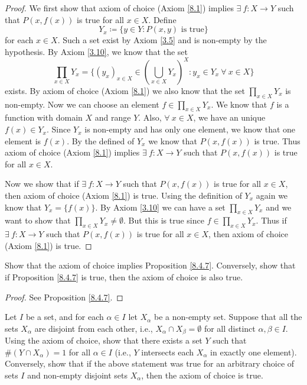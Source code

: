 \begin{proof}
    We first show that axiom of choice (Axiom \ref{8.1}) implies \(\exists\ f : X \to Y\) such that \(P(x, f(x))\) is true for all \(x \in X\).
    Define
    \[
        Y_x \coloneqq \{y \in Y : P(x, y) \text{ is true}\}
    \]
    for each \(x \in X\).
    Such a set exist by Axiom \ref{3.5} and is non-empty by the hypothesis.
    By Axiom \ref{3.10}, we know that the set
    \[
        \prod_{x \in X} Y_x = \Bigg\{(y_x)_{x \in X} \in (\bigcup_{x \in X} Y_x)^X : y_x \in Y_x \ \forall\ x \in X\Bigg\}
    \]
    exists.
    By axiom of choice (Axiom \ref{8.1}) we also know that the set \(\prod_{x \in X} Y_x\) is non-empty.
    Now we can choose an element \(f \in \prod_{x \in X} Y_x\).
    We know that \(f\) is a function with domain \(X\) and range \(Y\).
    Also, \(\forall\ x \in X\), we have an unique \(f(x) \in Y_x\).
    Since \(Y_x\) is non-empty and has only one element, we know that one element is \(f(x)\).
    By the defined of \(Y_x\) we know that \(P(x, f(x))\) is true.
    Thus axiom of choice (Axiom \ref{8.1}) implies \(\exists\ f : X \to Y\) such that \(P(x, f(x))\) is true for all \(x \in X\).

    Now we show that if \(\exists\ f : X \to Y\) such that \(P(x, f(x))\) is true for all \(x \in X\), then axiom of choice (Axiom \ref{8.1}) is true.
    Using the definition of \(Y_x\) again we know that \(Y_x = \{f(x)\}\).
    By Axiom \ref{3.10} we can have a set \(\prod_{x \in X} Y_x\) and we want to show that \(\prod_{x \in X} Y_x \neq \emptyset\).
    But this is true since \(f \in \prod_{x \in X} Y_x\).
    Thus if \(\exists\ f : X \to Y\) such that \(P(x, f(x))\) is true for all \(x \in X\), then axiom of choice (Axiom \ref{8.1}) is true.
\end{proof}

\exercisesection

\begin{exercise}\label{ex 8.4.1}
    Show that the axiom of choice implies Proposition \ref{8.4.7}.
    Conversely, show that if Proposition \ref{8.4.7} is true, then the axiom of choice is also true.
\end{exercise}

\begin{proof}
    See Proposition \ref{8.4.7}.
\end{proof}

\begin{exercise}\label{ex 8.4.2}
    Let \(I\) be a set, and for each \(\alpha \in I\) let \(X_{\alpha}\) be a non-empty set.
    Suppose that all the sets \(X_{\alpha}\) are disjoint from each other, i.e., \(X_{\alpha} \cap X_{\beta} = \emptyset\) for all distinct \(\alpha, \beta \in I\).
    Using the axiom of choice, show that there exists a set \(Y\) such that \(\#(Y \cap X_{\alpha}) = 1\) for all \(\alpha \in I\) (i.e., \(Y\) intersects each \(X_{\alpha}\) in exactly one element).
    Conversely, show that if the above statement was true for an arbitrary choice of sets \(I\) and non-empty disjoint sets \(X_{\alpha}\), then the axiom of choice is true.
\end{exercise}

